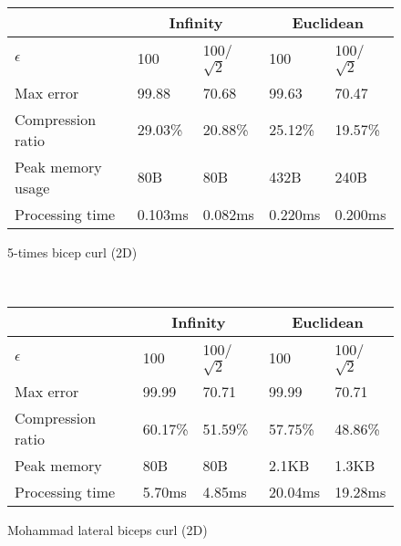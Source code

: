 \documentclass[10pt, conference, compsocconf]{IEEEtran}
\begin{document}
\begin{table}

    \begin{subfigure}{\columnwidth}
    \centering
    \begin{tabular}{l|l|l|l|l}
    \hline
    \rowcolor{headcolor}
                           & \multicolumn{2}{c|}{Infinity} & \multicolumn{2}{c}{Euclidean}\\ \hline
    $\epsilon$                & 100          & 100/$\sqrt{2}$  & 100         & 100/$\sqrt{2}$ \\
    Max error              & 99.88       & 70.68           & 99.63       & 70.47          \\ 
    Compression ratio      & 29.03\%      & 20.88\%         & 25.12\%     & 19.57\%        \\ 
    Peak memory usage      & 80B          & 80B             & 432B        & 240B           \\ 
    Processing time        & 0.103ms      & 0.082ms         & 0.220ms     & 0.200ms        \\ \hline
    \end{tabular}
    \caption{5-times bicep curl (2D)}
    \end{subfigure}\\
    \begin{subfigure}{\columnwidth}
    \centering
    \begin{tabular}{l|l|l|l|l}
    \hline
    \rowcolor{headcolor}
                   & \multicolumn{2}{c|}{Infinity} & \multicolumn{2}{c}{Euclidean} \\ \hline
    $\epsilon$             & 100        & 100/$\sqrt{2}$    & 100        & 100/$\sqrt{2}$    \\ 
    Max error              & 99.99     & 70.71             & 99.99      & 70.71             \\ 
    Compression ratio      & 60.17\%    & 51.59\%           & 57.75\%    & 48.86\%           \\ 
    Peak memory       & 80B        & 80B               & 2.1KB      & 1.3KB             \\ 
    Processing time      & 5.70ms     & 4.85ms            & 20.04ms    & 19.28ms           \\ \hline
    \end{tabular}
    \caption{Mohammad lateral biceps curl (2D)}
    \end{subfigure}\\    
    \begin{subfigure}{\columnwidth}

\end{subfigure}
\end{table}
\end{document}
